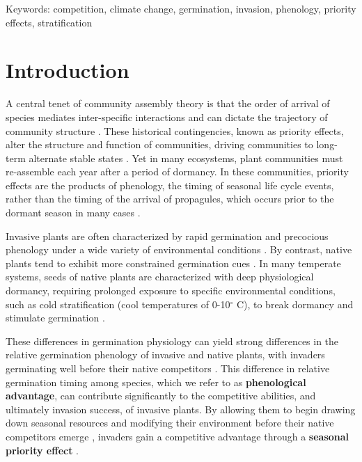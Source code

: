 \documentclass{article}[11pt]
\begin{document}
\begin{enumerate}
\end{enumerate}


Keywords: competition, climate change, germination, invasion, phenology, priority effects, stratification

\pagebreak
\section*{Introduction}
 A central tenet of community assembly theory is that the order of arrival of species mediates inter-specific interactions and can dictate the trajectory of community structure \citep{Fukami2015}. These historical contingencies, known as priority effects, alter the structure and function of communities, driving communities to long-term alternate stable states \citep{Fukami2011}. Yet in many ecosystems, plant communities must re-assemble each year after a period of dormancy. In these communities, priority effects are the products of phenology, the timing of seasonal life cycle events, rather than the timing of the arrival of propagules, which occurs prior to the dormant season in many cases \citep{Rudolf:2019aa,Howe:1982aa,Baskin:1988aa}. 

Invasive plants are often characterized by rapid germination and precocious phenology under a wide variety of environmental conditions \citep{Gioria2018,Gioria:2017wo,Wolkovich:2011uh,Smith:2013uj}. By contrast, native plants tend to exhibit more constrained germination cues \citep{Marushia:2010ug,Wainwright:2013tv,Van-Clef:2001to}. In many temperate systems, seeds of native plants are characterized with deep physiological dormancy, requiring prolonged exposure to specific environmental conditions, such as cold stratification (cool temperatures of 0-10$^{\circ}$ C), to break dormancy and stimulate germination \citep{Brink:2013wr,Cavieres:2017aa,Bradford:2007tj}. 

These differences in germination physiology can yield strong differences in the relative germination phenology of invasive and native plants, with invaders germinating well before their native competitors \citep{Gioria:2017wo}. This difference in relative germination timing among species, which we refer to as \textbf{phenological advantage}, can contribute significantly to the competitive abilities, and ultimately invasion success, of invasive plants. By allowing them to begin drawing down seasonal resources and modifying their environment before their native competitors emerge \citep{Kardol2013}, invaders gain a competitive advantage through a \textbf{seasonal priority effect} \citep{Wainwright_2011}.
\end{document}
